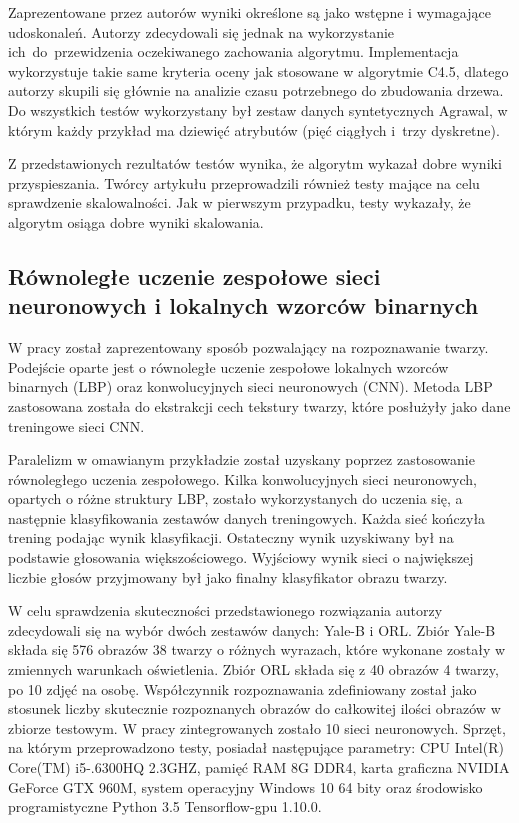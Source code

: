 \documentclass[12pt]{article}
\begin{document}
Zaprezentowane przez autorów wyniki określone są jako wstępne i wymagające udoskonaleń. Autorzy zdecydowali się jednak na wykorzystanie ich~do~przewidzenia oczekiwanego
zachowania algorytmu. Implementacja wykorzystuje takie same kryteria oceny jak stosowane w algorytmie C4.5, dlatego autorzy skupili się głównie na analizie czasu potrzebnego do
zbudowania drzewa. Do wszystkich testów wykorzystany był zestaw danych syntetycznych Agrawal, w którym każdy przykład ma dziewięć atrybutów (pięć ciągłych i~trzy dyskretne).

Z przedstawionych rezultatów testów wynika, że algorytm wykazał dobre wyniki przyspieszania. Twórcy artykułu przeprowadzili również testy mające na celu sprawdzenie skalowalności.
Jak w pierwszym przypadku, testy wykazały, że algorytm osiąga dobre wyniki skalowania.

\subsection{Równoległe uczenie zespołowe sieci neuronowych i lokalnych wzorców binarnych}

W pracy \cite{parallel-ensemble-learning} został zaprezentowany sposób pozwalający na rozpoznawanie twarzy.
Podejście oparte jest o równoległe uczenie zespołowe lokalnych wzorców binarnych (LBP) oraz konwolucyjnych sieci neuronowych (CNN). Metoda LBP zastosowana została
do ekstrakcji cech tekstury twarzy, które posłużyły jako dane treningowe sieci CNN.

Paralelizm w omawianym przykładzie został uzyskany poprzez zastosowanie równoległego uczenia zespołowego. Kilka konwolucyjnych sieci neuronowych, opartych o różne
struktury LBP, zostało wykorzystanych do uczenia się, a następnie klasyfikowania zestawów danych treningowych. Każda sieć kończyła trening podając wynik klasyfikacji. Ostateczny
wynik uzyskiwany był na podstawie głosowania większościowego. Wyjściowy wynik sieci o największej liczbie głosów przyjmowany był jako finalny klasyfikator obrazu twarzy.

W celu sprawdzenia skuteczności przedstawionego rozwiązania autorzy zdecydowali się na wybór dwóch zestawów danych: Yale-B i ORL. Zbiór Yale-B składa się 576 obrazów 38 twarzy
o różnych wyrazach, które wykonane zostały w zmiennych warunkach oświetlenia. Zbiór ORL składa się z 40 obrazów 4 twarzy, po 10 zdjęć na osobę. Współczynnik rozpoznawania
zdefiniowany został jako stosunek liczby skutecznie rozpoznanych obrazów do całkowitej ilości obrazów w zbiorze testowym. W pracy zintegrowanych zostało 10 sieci neuronowych.
Sprzęt, na którym przeprowadzono testy, posiadał następujące parametry: CPU Intel(R) Core(TM) i5-.6300HQ 2.3GHZ, pamięć RAM 8G DDR4, karta graficzna NVIDIA GeForce GTX 960M,
system operacyjny Windows 10 64 bity oraz środowisko programistyczne Python 3.5 Tensorflow-gpu 1.10.0.
\end{document}
